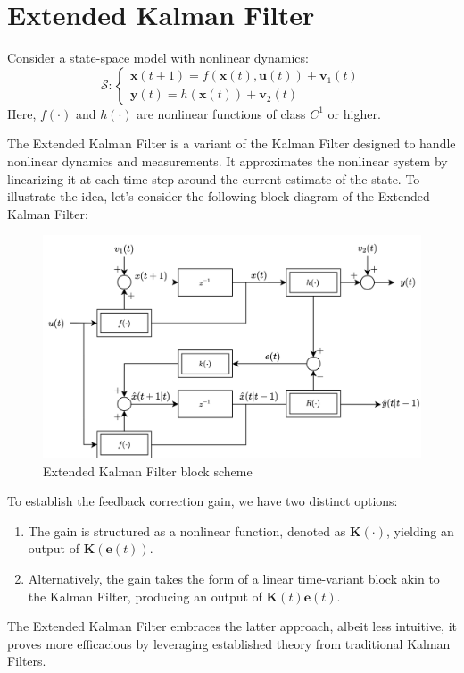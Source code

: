\section{Extended Kalman Filter}

Consider a state-space model with nonlinear dynamics:
\[\mathcal{S}:\begin{cases}
    \mathbf{x}(t+1)=f(\mathbf{x}(t),\mathbf{u}(t))+\mathbf{v}_1(t) \\
    \mathbf{y}(t)=h(\mathbf{x}(t))+\mathbf{v}_2(t)
\end{cases}\]
Here, $f(\cdot)$ and $h(\cdot)$ are nonlinear functions of class $C^1$ or higher.

The Extended Kalman Filter is a variant of the Kalman Filter designed to handle nonlinear dynamics and measurements. 
It approximates the nonlinear system by linearizing it at each time step around the current estimate of the state.
To illustrate the idea, let's consider the following block diagram of the Extended Kalman Filter:
\begin{figure}[H]
    \centering
    \includegraphics[width=0.75\linewidth]{images/ekf.png}
    \caption{Extended Kalman Filter block scheme}
\end{figure}
To establish the feedback correction gain, we have two distinct options:
\begin{enumerate}
    \item The gain is structured as a nonlinear function, denoted as $\mathbf{K}(\cdot)$, yielding an output of $\mathbf{K}(\mathbf{e}(t))$. 
    \item Alternatively, the gain takes the form of a linear time-variant block akin to the Kalman Filter, producing an output of $\mathbf{K}(t)\mathbf{e}(t)$. 
\end{enumerate}
The Extended Kalman Filter embraces the latter approach, albeit less intuitive, it proves more efficacious by leveraging established theory from traditional Kalman Filters.

